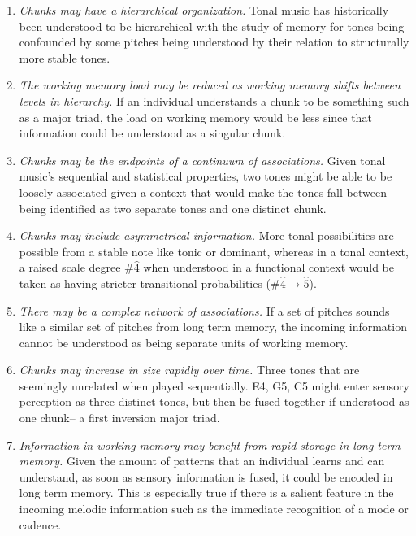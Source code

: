\documentclass[12pt,]{book}
\providecommand{\tightlist}{%
  \setlength{\itemsep}{0pt}\setlength{\parskip}{0pt}}
\begin{document}
\begin{enumerate}
\def\labelenumi{\arabic{enumi}.}
\tightlist
\item
  \emph{Chunks may have a hierarchical organization.} Tonal music has historically been understood to be hierarchical \citep{krumhanslCognitiveFoundationsMusical2001, meyerEmotionMeaningMusic1956, schenkerFreieSatz1935} with the study of memory for tones being confounded by some pitches being understood by their relation to structurally more stable tones.
\item
  \emph{The working memory load may be reduced as working memory shifts between levels in hierarchy.} If an individual understands a chunk to be something such as a major triad, the load on working memory would be less since that information could be understood as a singular chunk.
\item
  \emph{Chunks may be the endpoints of a continuum of associations.} Given tonal music's sequential and statistical properties, two tones might be able to be loosely associated given a context that would make the tones fall between being identified as two separate tones and one distinct chunk.
\item
  \emph{Chunks may include asymmetrical information.} More tonal possibilities are possible from a stable note like tonic or dominant, whereas in a tonal context, a raised scale degree \#\(\hat{4}\) when understood in a functional context would be taken as having stricter transitional probabilities (\#\(\hat{4} \rightarrow \hat{5}\)).
\item
  \emph{There may be a complex network of associations.} If a set of pitches sounds like a similar set of pitches from long term memory, the incoming information cannot be understood as being separate units of working memory.
\item
  \emph{Chunks may increase in size rapidly over time.} Three tones that are seemingly unrelated when played sequentially. E4, G5, C5 might enter sensory perception as three distinct tones, but then be fused together if understood as one chunk-- a first inversion major triad.
\item
  \emph{Information in working memory may benefit from rapid storage in long term memory.} Given the amount of patterns that an individual learns and can understand, as soon as sensory information is fused, it could be encoded in long term memory. This is especially true if there is a salient feature in the incoming melodic information such as the immediate recognition of a mode or cadence.
  \newpage
\end{enumerate}
\end{document}

